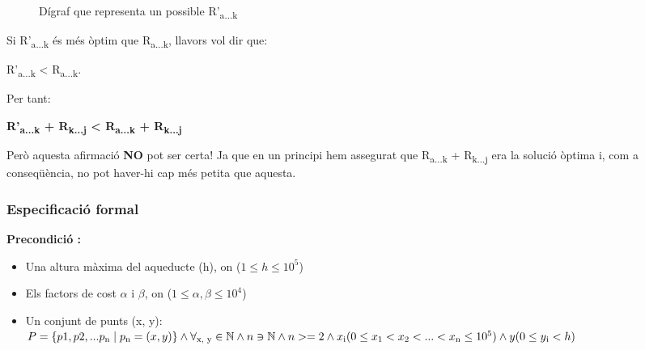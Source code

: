 \documentclass[12pt, letterpaper]{article}
\begin{document}
\begin{figure}[htbp]
\begin{center}
\caption{Dígraf que representa un possible R'\textsubscript{a...k}}
\label{demostracio:atoktojhypotetical}
\end{center}
\end{figure}

Si R'\textsubscript{a...k} és més òptim que R\textsubscript{a...k}, llavors vol dir que: \\
\begin{center}
R'\textsubscript{a...k} < R\textsubscript{a...k}.\\
\end{center}
Per tant:\\
\begin{center}
\textbf{R'\textsubscript{a...k} + R\textsubscript{k...j} < R\textsubscript{a...k} + R\textsubscript{k...j}} \\
\end{center}

Però aquesta afirmació \textbf{NO} pot ser certa! Ja que en un principi hem assegurat que R\textsubscript{a...k} + R\textsubscript{k...j} era la solució òptima i, com a conseqüència, no pot haver-hi cap més petita que aquesta.


\subsubsection{Especificació formal}

\textbf{Precondició :}

\begin{itemize}
    \item Una altura màxima del aqueducte (h), on ($1 \leq h \leq 10^5$)
    \item Els factors de cost $\alpha$ i $\beta$, on ($1\leq \alpha, \beta \leq 10^4$)
    \item Un conjunt de punts (x, y):\\
        $P = \{p1, p2, ... p\textsubscript{n} \mid p\textsubscript{n} = (x, y) \} \land \forall \textsubscript{x, y} \in \mathbb{N} \land n \owns \mathbb{N} \land n >= 2 
        \land x\textsubscript{i} (0\leq x\textsubscript{1} < x\textsubscript{2} < ... < x\textsubscript{n} \leq 10^5) \land y (0 \leq y\textsubscript{i} < h) $

\end{itemize}
\end{document}

